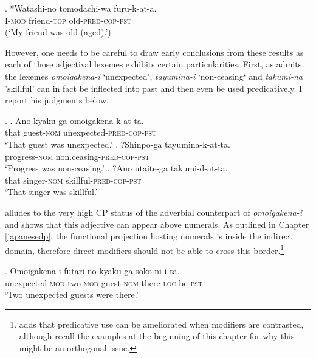 \documentclass [output=book,colorlinks,citecolor=brown]{langscibook}
\begin{document}
\exg. *Watashi-no tomodachi-wa furu-k-at-a.\\
I-\textsc{mod} friend-\textsc{top} old-\textsc{pred-cop-pst}\\
(`My friend was old (aged).’)

However, one needs to be careful to draw early conclusions from these results as each of those adjectival lexemes exhibits certain particularities. First, as \citet{ayano:2010:revisiting} admits, the lexemes \textit{omoigakena-i} `unexpected', \textit{tayumina-i} `non-ceasing` and \textit{takumi-na} 'skillful' can in fact be inflected into past and then even be used predicatively. I report his judgments below. %

\ex. \ag. Ano kyaku-ga omoigakena-k-at-ta.\\
that guest-\textsc{nom} unexpected-\textsc{pred-cop-pst}\\
`That guest was unexpected.'
\bg. ?Shinpo-ga tayumina-k-at-ta.\\
progress-\textsc{nom} non.ceasing-\textsc{pred-cop-pst}\\
`Progress was non-ceasing.'
\cg. ?Ano utaite-ga takumi-d-at-ta.\\
that singer-\textsc{nom} skillful-\textsc{pred-cop-pst}\\
`That singer was skillful.' \null \hfill \citep[109]{ayano:2010:revisiting}

\citet{watanabe:2017:attributive} alludes to the very high CP status of the adverbial counterpart of \textit{omoigakena-i} and shows that this adjective can appear above numerals. As outlined in Chapter \ref{japanesedp}, the functional projection hosting numerals is inside the indirect domain, therefore direct modifiers should not be able to cross this border.\footnote{\citet{hoshi:2002:kaynean} adds that predicative use can be ameliorated when modifiers are contrasted, although recall the examples at the beginning of this chapter for why this might be an orthogonal issue.}

\exg. Omoigakena-i futari-no kyaku-ga soko-ni i-ta.\\
unexpected-\textsc{mod} two-\textsc{mod} guest-\textsc{nom} there-\textsc{loc} be-\textsc{pst}\\
`Two unexpected guests were there.’ \null \hfill \citep[790]{watanabe:2017:attributive}
\end{document}
